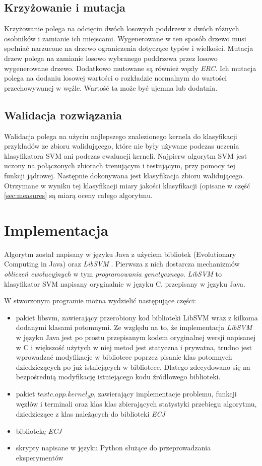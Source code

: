 \subsection{Krzyżowanie i mutacja}
Krzyżowanie polega na odcięciu dwóch losowych poddrzew z dwóch różnych osobników i zamianie ich miejscami. Wygenerowane w ten sposób drzewo musi spełniać narzucone na drzewo ograniczenia dotyczące typów i wielkości.
Mutacja drzew polega na zamianie losowo wybranego poddrzewa przez losowo wygenerowane drzewo.
Dodatkowo mutowane są również węzły \emph{ERC}. Ich mutacja polega na dodaniu losowej wartości o rozkładzie normalnym do wartości przechowywanej w węźle. Wartość ta może być ujemna lub dodatnia.

\subsection{Walidacja rozwiązania}
Walidacja polega na użyciu najlepszego znalezionego kernela do klasyfikacji przykładów ze zbioru walidującego, które nie były używane podczas uczenia klasyfikatora SVM ani podczas ewaluacji kerneli.
Najpierw algorytm SVM jest uczony na połączonych zbiorach trenującym i testującym, przy pomocy tej funkcji jądrowej. Następnie dokonywana jest klasyfikacja zbioru walidującego. Otrzymane w wyniku tej klasyfikacji miary jakości klasyfikacji (opisane w część \ref{sec:measures} są miarą oceny całego algorytmu.


\section{Implementacja}
Algorytm został napisany w języku Java z użyciem bibliotek  (Evolutionary Computing in Java) \cite{sean_ecj_2010} oraz \emph{LibSVM} \cite{chang_libsvm:_2011}. Pierwsza z nich dostarcza mechanizmów \textit{obliczeń ewolucyjnych} w tym \textit{programowania genetycznego}. \emph{LibSVM} to klasyfikator SVM napisany oryginalnie w języku C, przepisany w języku Java.

W stworzonym programie można wydzielić następujące części:
\begin{itemize}
\item pakiet $ \text{libsvm} $, zawierający przerobiony kod biblioteki LibSVM wraz z kilkoma dodanymi klasami potomnymi. Ze względu na to, że implementacja \emph{LibSVM} w języku Java jest po prostu przepisanym kodem oryginalnej wersji napisanej w C i większość użytych w niej metod jest statyczna i prywatna, trudno jest wprowadzać modyfikacje w bibliotece poprzez pisanie klas potomnych dziedziczących po już istniejących w bibliotece. Dlatego zdecydowano się na bezpośrednią modyfikację istniejącego kodu źródłowego biblioteki.
\item pakiet $ text{c.app.kernel_gp} $, zawierający implementacje problemu, funkcji węzłów i terminali oraz klas klas zbierających statystyki przebiegu algorytmu, dziedziczące z klas należących do biblioteki \emph{ECJ}
\item bibliotekę \emph{ECJ}
\item skrypty napisane w języku Python służące do przeprowadzania eksperymentów
\end{itemize}


